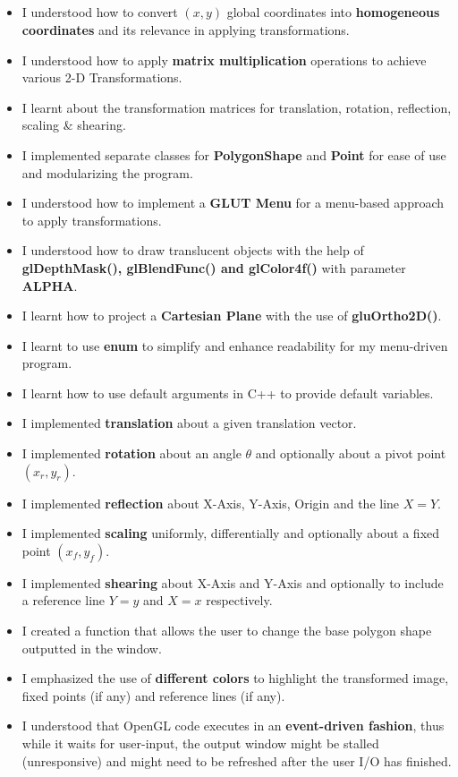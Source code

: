 \documentclass[12pt, a4]{article}
\begin{document}
\subsection*{}
\begin{itemize}
\item I understood how to convert $(x, y)$ global coordinates into \textbf{homogeneous coordinates} and its relevance in applying transformations.
\item I understood how to apply \textbf{matrix multiplication} operations to achieve various 2-D Transformations.
\item I learnt about the transformation matrices for translation, rotation, reflection, scaling \& shearing.
\item I implemented separate classes for \textbf{PolygonShape} and \textbf{Point} for ease of use and modularizing the program.
\item I understood how to implement a \textbf{GLUT Menu} for a menu-based approach to apply transformations.
\item I understood how to draw translucent objects with the help of \textbf{glDepthMask(), glBlendFunc() and glColor4f()} with parameter \textbf{ALPHA}.
\item I learnt how to project a \textbf{Cartesian Plane} with the use of \textbf{gluOrtho2D()}.
\item I learnt to use \textbf{enum} to simplify and enhance readability for my menu-driven program.
\item I learnt how to use default arguments in C++ to provide default variables.
\item I implemented \textbf{translation} about a given translation vector.
\item I implemented \textbf{rotation} about an angle $\theta$ and optionally about a pivot point $(x_r, y_r)$.
\item I implemented \textbf{reflection} about X-Axis, Y-Axis, Origin and the line $X = Y$.
\item I implemented \textbf{scaling} uniformly, differentially and optionally about a fixed point $(x_f, y_f)$.
\item I implemented \textbf{shearing} about X-Axis and Y-Axis and optionally to include a reference line $Y = y$ and $X = x$ respectively.
\item I created a function that allows the user to change the base polygon shape outputted in the window.
\item I emphasized the use of \textbf{different colors} to highlight the transformed image, fixed points (if any) and reference lines (if any).
\item I understood that OpenGL code executes in an \textbf{event-driven fashion}, thus while it waits for user-input, the output window might be stalled (unresponsive) and might need to be refreshed after the user I/O has finished.

\end{itemize}
\end{document}
